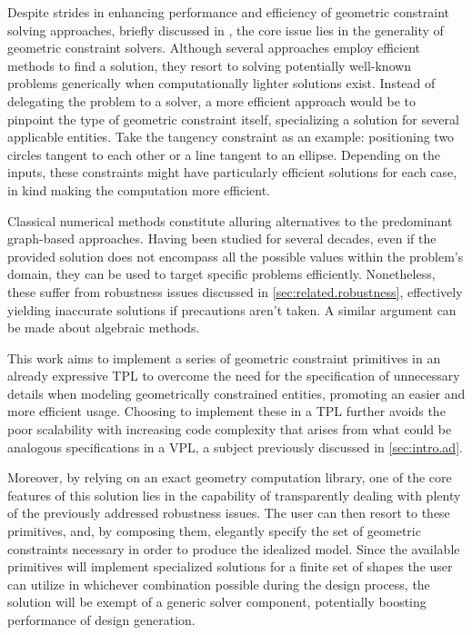 %
\label{chap:solution}
\cleardoublepage{}


\noindent
Despite strides in enhancing performance and efficiency of geometric constraint
solving approaches, briefly discussed in , the core
issue lies in the generality of geometric constraint solvers.  Although several
approaches employ efficient methods to find a solution, they resort to solving
potentially well-known problems generically when computationally lighter
solutions exist.  Instead of delegating the problem to a solver, a more
efficient approach would be to pinpoint the type of geometric constraint itself,
specializing a solution for several applicable entities.  Take the tangency
constraint as an example: positioning two circles tangent to each other or a
line tangent to an ellipse.  Depending on the inputs, these constraints might
have particularly efficient solutions for each case, in kind making the
computation more efficient.

Classical numerical methods constitute alluring alternatives to the predominant
graph-based approaches.  Having been studied for several decades, even if the
provided solution does not encompass all the possible values within the
problem's domain, they can be used to target specific problems efficiently.
Nonetheless, these suffer from robustness issues discussed in
\cref{sec:related.robustness}, effectively yielding inaccurate solutions if
precautions aren't taken.  A similar argument can be made about algebraic
methods.

This work aims to implement a series of geometric constraint primitives in an
already expressive \ac{TPL} to overcome the need for the specification of
unnecessary details when modeling geometrically constrained entities, promoting
an easier and more efficient usage.  Choosing to implement these in a \ac{TPL}
further avoids the poor scalability with increasing code complexity that arises
from what could be analogous specifications in a \ac{VPL}, a subject previously
discussed in \cref{sec:intro.ad}.

Moreover, by relying on an exact geometry computation library, one of the core
features of this solution lies in the capability of transparently dealing with
plenty of the previously addressed robustness issues.  The user can then resort
to these primitives, and, by composing them, elegantly specify the set of
geometric constraints necessary in order to produce the idealized model.  Since
the available primitives will implement specialized solutions for a finite set
of shapes the user can utilize in whichever combination possible during the
design process, the solution will be exempt of a generic solver component,
potentially boosting performance of design generation.

